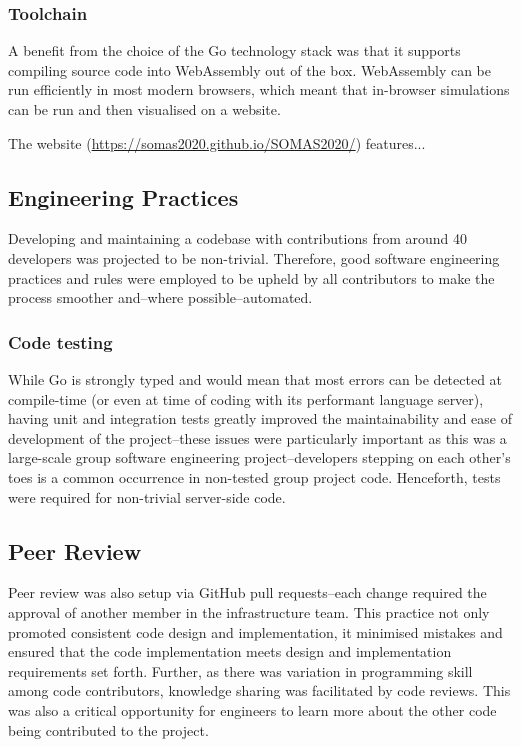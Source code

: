\subsubsection{Toolchain}
A benefit from the choice of the Go technology stack was that it supports compiling source code into WebAssembly out of the box. WebAssembly can be run efficiently in most modern browsers, which meant that in-browser simulations can be run and then visualised on a website.

The website (\url{https://somas2020.github.io/SOMAS2020/}) features... %

\subsection{Engineering Practices}
\label{sec:GD:implementation:practices}

Developing and maintaining a codebase with contributions from around 40 developers was projected to be non-trivial. Therefore, good software engineering practices and rules were employed to be upheld by all contributors to make the process smoother and--where possible--automated.

\subsubsection{Code testing}

While Go is strongly typed and would mean that most errors can be detected at compile-time (or even at time of coding with its performant language server), having unit and integration tests greatly improved the maintainability and ease of development of the project--these issues were particularly important as this was a large-scale group software engineering project--developers stepping on each other's toes is a common occurrence in non-tested group project code. Henceforth, tests were required for non-trivial server-side code.

\subsection{Peer Review}

Peer review was also setup via GitHub pull requests--each change required the approval of another member in the infrastructure team. This practice not only promoted consistent code design and implementation, it minimised mistakes and ensured that the code implementation meets design and implementation requirements set forth. Further, as there was variation in programming skill among code contributors, knowledge sharing was facilitated by code reviews. This was also a critical opportunity for engineers to learn more about the other code being contributed to the project.

